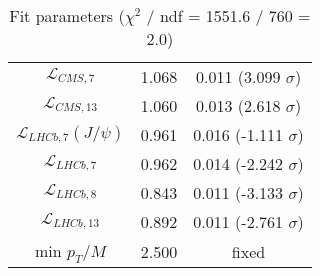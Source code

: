\begin{table}[h!]
\begin{tabular}{c|c|c}
$\mathcal L_{CMS,7}$ & 1.068 & 0.011 (3.099 $\sigma$) \\
$\mathcal L_{CMS,13}$ & 1.060 & 0.013 (2.618 $\sigma$) \\
$\mathcal L_{LHCb,7}(J/\psi)$ & 0.961 & 0.016 (-1.111 $\sigma$) \\
$\mathcal L_{LHCb,7}$ & 0.962 & 0.014 (-2.242 $\sigma$) \\
$\mathcal L_{LHCb,8}$ & 0.843 & 0.011 (-3.133 $\sigma$) \\
$\mathcal L_{LHCb,13}$ & 0.892 & 0.011 (-2.761 $\sigma$) \\
min $p_T/M$ & 2.500 & fixed \\
\end{tabular}
\caption{Fit parameters ($\chi^2$ / ndf = 1551.6 / 760 = 2.0)}
\end{table}
